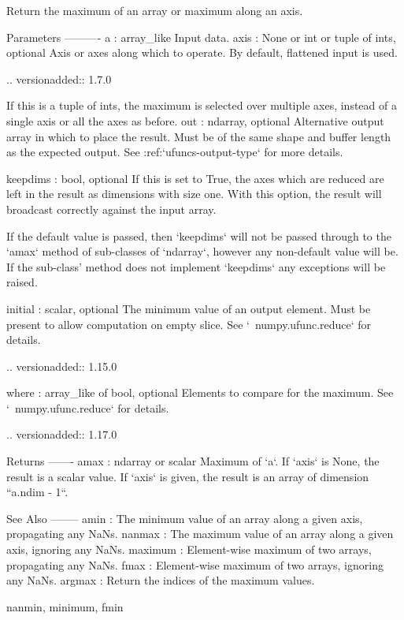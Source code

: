 \begin{DoxyVerb}Return the maximum of an array or maximum along an axis.

Parameters
----------
a : array_like
    Input data.
axis : None or int or tuple of ints, optional
    Axis or axes along which to operate.  By default, flattened input is
    used.

    .. versionadded:: 1.7.0

    If this is a tuple of ints, the maximum is selected over multiple axes,
    instead of a single axis or all the axes as before.
out : ndarray, optional
    Alternative output array in which to place the result.  Must
    be of the same shape and buffer length as the expected output.
    See :ref:`ufuncs-output-type` for more details.

keepdims : bool, optional
    If this is set to True, the axes which are reduced are left
    in the result as dimensions with size one. With this option,
    the result will broadcast correctly against the input array.

    If the default value is passed, then `keepdims` will not be
    passed through to the `amax` method of sub-classes of
    `ndarray`, however any non-default value will be.  If the
    sub-class' method does not implement `keepdims` any
    exceptions will be raised.

initial : scalar, optional
    The minimum value of an output element. Must be present to allow
    computation on empty slice. See `~numpy.ufunc.reduce` for details.

    .. versionadded:: 1.15.0

where : array_like of bool, optional
    Elements to compare for the maximum. See `~numpy.ufunc.reduce`
    for details.

    .. versionadded:: 1.17.0

Returns
-------
amax : ndarray or scalar
    Maximum of `a`. If `axis` is None, the result is a scalar value.
    If `axis` is given, the result is an array of dimension
    ``a.ndim - 1``.

See Also
--------
amin :
    The minimum value of an array along a given axis, propagating any NaNs.
nanmax :
    The maximum value of an array along a given axis, ignoring any NaNs.
maximum :
    Element-wise maximum of two arrays, propagating any NaNs.
fmax :
    Element-wise maximum of two arrays, ignoring any NaNs.
argmax :
    Return the indices of the maximum values.

nanmin, minimum, fmin


\end{DoxyVerb}
